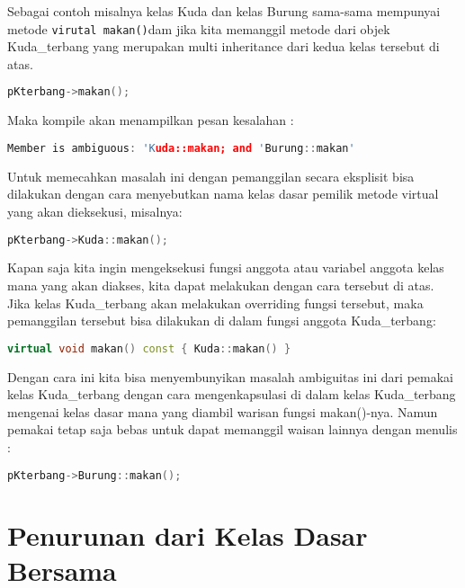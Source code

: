 Sebagai contoh misalnya kelas Kuda dan kelas Burung sama-sama mempunyai
metode \texttt{virutal\ makan()}dam jika kita memanggil metode dari
objek Kuda\_terbang yang merupakan multi inheritance dari kedua kelas
tersebut di atas.

\begin{lstlisting}[language=c++, numbers=none]
pKterbang->makan();
\end{lstlisting}

Maka kompile akan menampilkan pesan kesalahan :

\begin{lstlisting}[language=c++, numbers=none]
Member is ambiguous: 'Kuda::makan; and 'Burung::makan'
\end{lstlisting}

Untuk memecahkan masalah ini dengan pemanggilan secara eksplisit bisa
dilakukan dengan cara menyebutkan nama kelas dasar pemilik metode
virtual yang akan dieksekusi, misalnya:

\begin{lstlisting}[language=c++, numbers=none]
pKterbang->Kuda::makan();
\end{lstlisting}

Kapan saja kita ingin mengeksekusi fungsi anggota atau variabel anggota
kelas mana yang akan diakses, kita dapat melakukan dengan cara tersebut
di atas. Jika kelas Kuda\_terbang akan melakukan overriding fungsi
tersebut, maka pemanggilan tersebut bisa dilakukan di dalam fungsi
anggota Kuda\_terbang:

\begin{lstlisting}[language=c++, numbers=none]
virtual void makan() const { Kuda::makan() }
\end{lstlisting}

Dengan cara ini kita bisa menyembunyikan masalah ambiguitas ini dari
pemakai kelas Kuda\_terbang dengan cara mengenkapsulasi di dalam kelas
Kuda\_terbang mengenai kelas dasar mana yang diambil warisan fungsi
makan()-nya. Namun pemakai tetap saja bebas untuk dapat memanggil waisan
lainnya dengan menulis :

\begin{lstlisting}[language=c++, numbers=none]
pKterbang->Burung::makan();
\end{lstlisting}

\section{Penurunan dari Kelas Dasar
Bersama}\label{penurunan-dari-kelas-dasar-bersama}

